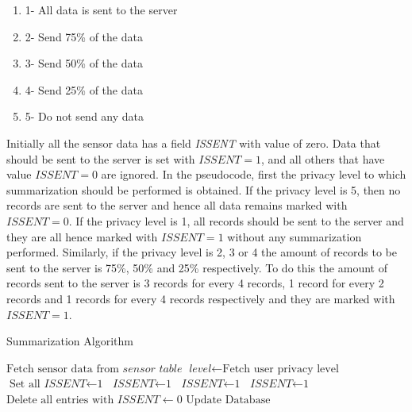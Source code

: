 \begin{enumerate}
	\item 1- All data is sent to the server
	\item 2- Send 75\% of the data
    \item 3- Send 50\% of the data
    \item 4- Send 25\% of the data
    \item 5- Do not send any data
\end{enumerate}

Initially all the sensor data has a field \textit{ISSENT} with value of zero. Data that should be sent to the server is set with $\textit{ISSENT}=1$, and all others that have value $\textit{ISSENT}=0$ are ignored. In the pseudocode, first the privacy level to which summarization should be performed is obtained. If the privacy level is 5, then no records are sent to the server and hence all data remains marked with $\textit{ISSENT}=0$. If the privacy level is 1, all records should be sent to the server and they are all hence marked with $\textit{ISSENT}=1$ without any summarization performed. Similarly, if the privacy level is 2, 3 or 4 the amount of records to be sent to the server is 75\%, 50\% and 25\% respectively. To do this the amount of records sent to the server is 3 records for every 4 records, 1 record for every 2 records and 1 records for every 4 records respectively and they are marked with $\textit{ISSENT}=1$.

\begin{algorithm}
\caption{Summarization Algorithm}\label{sum}
\begin{algorithmic}[1]
\State $\text{Fetch sensor data from } \textit{sensor table}$
\State $\textit{level} \gets \text{Fetch user privacy level}$
  \State $\text{Set all } \textit{ISSENT} \gets \text{1}$
 	 \State $\textit{ISSENT} \gets \text{1}$
 	\EndFor 
{}
 	 \State $\textit{ISSENT} \gets \text{1}$
 	\EndFor
{}
 	 \State $\textit{ISSENT} \gets \text{1}$
 	\EndFor
\EndIf
\State $\text{Delete all entries with } \textit{ISSENT} \gets 0$
\State $\text{Update Database}$
\EndFor
\EndProcedure
\end{algorithmic}
\end{algorithm}

